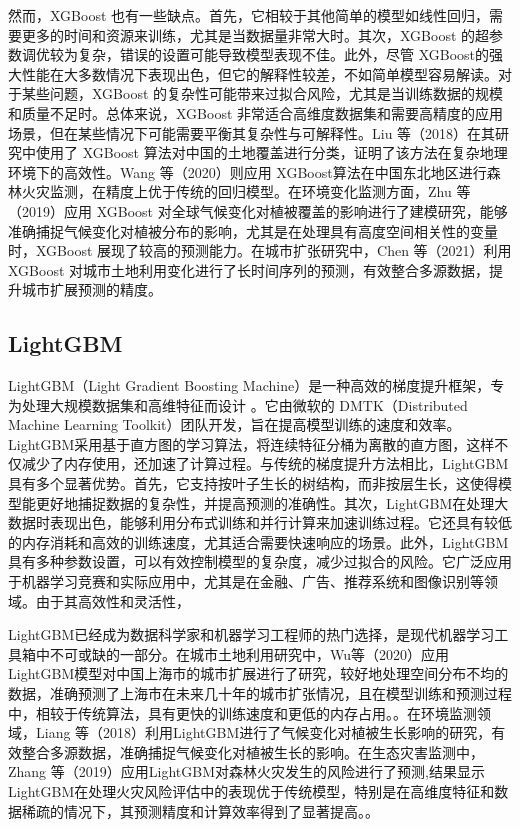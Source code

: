 \documentclass[AutoFakeBold]{LZUThesis-PgD&PhD}
\begin{document}
	然而，XGBoost 也有一些缺点。首先，它相较于其他简单的模型如线性回归，需要更多的时间和资源来训练，尤其是当数据量非常大时。其次，XGBoost 的超参数调优较为复杂，错误的设置可能导致模型表现不佳。此外，尽管 XGBoost的强大性能在大多数情况下表现出色，但它的解释性较差，不如简单模型容易解读。对于某些问题，XGBoost 的复杂性可能带来过拟合风险，尤其是当训练数据的规模和质量不足时。总体来说，XGBoost 非常适合高维度数据集和需要高精度的应用场景，但在某些情况下可能需要平衡其复杂性与可解释性。Liu 等（2018）在其研究中使用了 XGBoost 算法对中国的土地覆盖进行分类，证明了该方法在复杂地理环境下的高效性\cite{liu2018}。Wang 等（2020）则应用 XGBoost算法在中国东北地区进行森林火灾监测，在精度上优于传统的回归模型\cite{wang2020Y}。在环境变化监测方面，Zhu 等（2019）应用 XGBoost 对全球气候变化对植被覆盖的影响进行了建模研究，能够准确捕捉气候变化对植被分布的影响，尤其是在处理具有高度空间相关性的变量时，XGBoost 展现了较高的预测能力\cite{zhu2019}。在城市扩张研究中，Chen 等（2021）利用 XGBoost 对城市土地利用变化进行了长时间序列的预测，有效整合多源数据，提升城市扩展预测的精度\cite{chen2021}。
	
	\subsection{LightGBM}
	LightGBM（Light Gradient Boosting Machine）是一种高效的梯度提升框架，专为处理大规模数据集和高维特征而设计 \cite{ke2017lightgbm}。它由微软的 DMTK（Distributed Machine Learning Toolkit）团队开发，旨在提高模型训练的速度和效率。LightGBM采用基于直方图的学习算法，将连续特征分桶为离散的直方图，这样不仅减少了内存使用，还加速了计算过程。与传统的梯度提升方法相比，LightGBM具有多个显著优势。首先，它支持按叶子生长的树结构，而非按层生长，这使得模型能更好地捕捉数据的复杂性，并提高预测的准确性。其次，LightGBM在处理大数据时表现出色，能够利用分布式训练和并行计算来加速训练过程。它还具有较低的内存消耗和高效的训练速度，尤其适合需要快速响应的场景。此外，LightGBM具有多种参数设置，可以有效控制模型的复杂度，减少过拟合的风险。它广泛应用于机器学习竞赛和实际应用中，尤其是在金融、广告、推荐系统和图像识别等领域。由于其高效性和灵活性，
	
	LightGBM已经成为数据科学家和机器学习工程师的热门选择，是现代机器学习工具箱中不可或缺的一部分。在城市土地利用研究中，Wu等（2020）应用LightGBM模型对中国上海市的城市扩展进行了研究，较好地处理空间分布不均的数据，准确预测了上海市在未来几十年的城市扩张情况，且在模型训练和预测过程中，相较于传统算法，具有更快的训练速度和更低的内存占用。\cite{wu2020}。在环境监测领域，Liang 等（2018）利用LightGBM进行了气候变化对植被生长影响的研究，有效整合多源数据，准确捕捉气候变化对植被生长的影响\cite{liang2018}。在生态灾害监测中，Zhang 等（2019）应用LightGBM对森林火灾发生的风险进行了预测,结果显示LightGBM在处理火灾风险评估中的表现优于传统模型，特别是在高维度特征和数据稀疏的情况下，其预测精度和计算效率得到了显著提高。\cite{zhang2019}。
	
\end{document}
